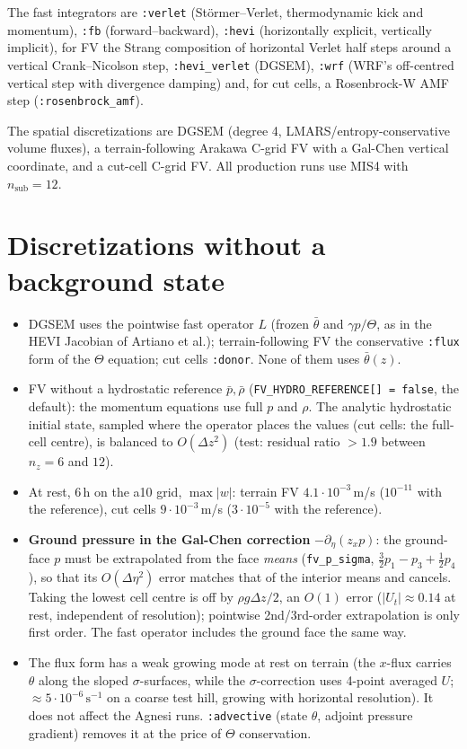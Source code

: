 \documentclass[11pt,a4paper]{article}
\newcommand{\code}[1]{\texttt{#1}}
\begin{document}
The fast integrators are \code{:verlet} (Störmer--Verlet, thermodynamic kick and momentum),
\code{:fb} (forward--backward), \code{:hevi} (horizontally explicit, vertically implicit), for FV
the Strang composition of horizontal Verlet half steps around a vertical Crank--Nicolson step,
\code{:hevi\_verlet} (DGSEM), \code{:wrf} (WRF's off-centred vertical step with divergence damping)
and, for cut cells, a Rosenbrock-W AMF step (\code{:rosenbrock\_amf}).

The spatial discretizations are DGSEM (degree 4, LMARS/entropy-conservative volume fluxes), a
terrain-following Arakawa C-grid FV with a Gal-Chen vertical coordinate, and a cut-cell C-grid FV.
All production runs use MIS4 with $n_\mathrm{sub} = 12$.

\section{Discretizations without a background state}

\begin{itemize}
\item DGSEM uses the pointwise fast operator $L$ (frozen $\bar\theta$ and $\gamma p/\Theta$, as in the
  HEVI Jacobian of Artiano et al.); terrain-following FV the conservative \code{:flux} form of the
  $\Theta$ equation; cut cells \code{:donor}. None of them uses $\bar\theta(z)$.
\item FV without a hydrostatic reference $\bar p, \bar\rho$ (\code{FV\_HYDRO\_REFERENCE[] = false},
  the default): the momentum equations use full $p$ and $\rho$. The analytic hydrostatic initial
  state, sampled where the operator places the values (cut cells: the full-cell centre), is balanced
  to $O(\Delta z^2)$ (test: residual ratio $> 1.9$ between $n_z = 6$ and $12$).
\item At rest, 6\,h on the a10 grid, $\max|w|$: terrain FV $4.1\cdot10^{-3}$\,m/s ($10^{-11}$ with
  the reference), cut cells $9\cdot10^{-3}$\,m/s ($3\cdot10^{-5}$ with the reference).
\item \textbf{Ground pressure in the Gal-Chen correction} $-\partial_\eta(z_x p)$: the ground-face
  $p$ must be extrapolated from the face \emph{means} (\code{fv\_p\_sigma},
  $\tfrac32 p_1 - p_3 + \tfrac12 p_4$), so that its $O(\Delta\eta^2)$ error matches that of the
  interior means and cancels. Taking the lowest cell centre is off by $\rho g\Delta z/2$, an $O(1)$
  error ($|U_t|\approx 0.14$ at rest, independent of resolution); pointwise 2nd/3rd-order
  extrapolation is only first order. The fast operator includes the ground face the same way.
\item The flux form has a weak growing mode at rest on terrain (the $x$-flux carries $\theta$ along
  the sloped $\sigma$-surfaces, while the $\sigma$-correction uses 4-point averaged $U$;
  $\approx 5\cdot10^{-6}\,\mathrm{s}^{-1}$ on a coarse test hill, growing with horizontal resolution).
  It does not affect the Agnesi runs. \code{:advective} (state $\theta$, adjoint pressure gradient)
  removes it at the price of $\Theta$ conservation.
\end{itemize}
\end{document}
